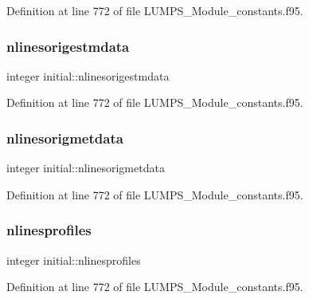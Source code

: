 Definition at line 772 of file L\+U\+M\+P\+S\+\_\+\+Module\+\_\+constants.\+f95.

\mbox{\label{namespaceinitial_aa63293cecb7c4a1c022b040f9e01e949}} 
\subsubsection{\texorpdfstring{nlinesorigestmdata}{nlinesorigestmdata}}
{\footnotesize\ttfamily integer initial\+::nlinesorigestmdata}



Definition at line 772 of file L\+U\+M\+P\+S\+\_\+\+Module\+\_\+constants.\+f95.

\mbox{\label{namespaceinitial_a6340087c9b63ab9063c64b890941fabd}} 
\subsubsection{\texorpdfstring{nlinesorigmetdata}{nlinesorigmetdata}}
{\footnotesize\ttfamily integer initial\+::nlinesorigmetdata}



Definition at line 772 of file L\+U\+M\+P\+S\+\_\+\+Module\+\_\+constants.\+f95.

\mbox{\label{namespaceinitial_a50fc08b99235baf0ef2959b630731ab7}} 
\subsubsection{\texorpdfstring{nlinesprofiles}{nlinesprofiles}}
{\footnotesize\ttfamily integer initial\+::nlinesprofiles}



Definition at line 772 of file L\+U\+M\+P\+S\+\_\+\+Module\+\_\+constants.\+f95.

\mbox{\label{namespaceinitial_a3e3aa2dac6195f74548fffbcb36e70a9}} 
